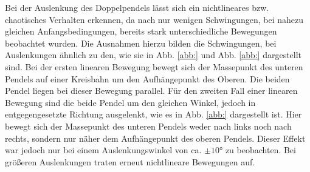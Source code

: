 \documentclass[11pt,a4paper,titlepage, ngerman]{article}
\newcommand{\refabb}[1]{Abb. \ref{abb:#1}}
\begin{document}
		Bei der Auslenkung des Doppelpendels lässt sich ein nichtlineares bzw. chaotisches Verhalten erkennen, da nach nur wenigen Schwingungen, bei nahezu gleichen Anfangsbedingungen, bereits stark unterschiedliche Bewegungen beobachtet wurden. 
		Die Ausnahmen hierzu bilden die Schwingungen, bei Auslenkungen ähnlich zu den, wie sie in \refabb{} und \refabb{} dargestellt sind. Bei der ersten linearen Bewegung bewegt sich der Massepunkt des unteren Pendels auf einer Kreisbahn um den Aufhängepunkt des Oberen. Die beiden Pendel liegen bei dieser Bewegung parallel. Für den zweiten Fall einer linearen Bewegung sind die beide Pendel um den gleichen Winkel, jedoch in entgegengesetzte Richtung ausgelenkt, wie es in \refabb{} dargestellt ist. Hier bewegt sich der Massepunkt des unteren Pendels weder nach links noch nach rechts, sondern nur näher dem Aufhängepunkt des oberen Pendels. Dieser Effekt war jedoch nur bei einem Auslenkungswinkel von ca. $\pm \ang{10}$ zu beobachten. Bei größeren Auslenkungen traten erneut nichtlineare Bewegungen auf. 
		
\end{document}
